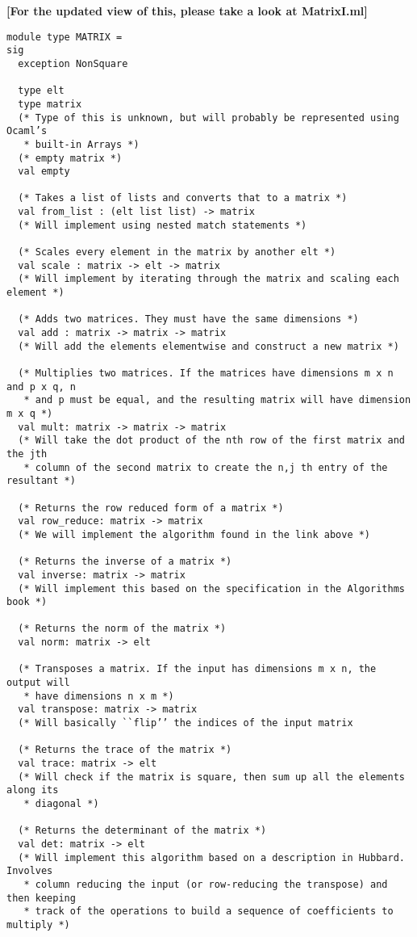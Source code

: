 \documentclass[letterpaper,11pt]{article}
\newcommand{\annot}[1]{\textbf{\color{BrickRed} [#1]}}
\begin{document}
{\annot{For the updated view of this, please take a look at MatrixI.ml}}
\begin{verbatim}
module type MATRIX = 
sig
  exception NonSquare
  
  type elt
  type matrix
  (* Type of this is unknown, but will probably be represented using Ocaml’s
   * built-in Arrays *)
  (* empty matrix *)
  val empty

  (* Takes a list of lists and converts that to a matrix *)
  val from_list : (elt list list) -> matrix
  (* Will implement using nested match statements *)

  (* Scales every element in the matrix by another elt *)
  val scale : matrix -> elt -> matrix
  (* Will implement by iterating through the matrix and scaling each element *)

  (* Adds two matrices. They must have the same dimensions *)
  val add : matrix -> matrix -> matrix
  (* Will add the elements elementwise and construct a new matrix *)

  (* Multiplies two matrices. If the matrices have dimensions m x n and p x q, n
   * and p must be equal, and the resulting matrix will have dimension m x q *)
  val mult: matrix -> matrix -> matrix
  (* Will take the dot product of the nth row of the first matrix and the jth
   * column of the second matrix to create the n,j th entry of the resultant *)

  (* Returns the row reduced form of a matrix *)
  val row_reduce: matrix -> matrix 
  (* We will implement the algorithm found in the link above *)

  (* Returns the inverse of a matrix *)
  val inverse: matrix -> matrix
  (* Will implement this based on the specification in the Algorithms book *)

  (* Returns the norm of the matrix *)
  val norm: matrix -> elt

  (* Transposes a matrix. If the input has dimensions m x n, the output will
   * have dimensions n x m *)
  val transpose: matrix -> matrix
  (* Will basically ``flip’’ the indices of the input matrix

  (* Returns the trace of the matrix *)
  val trace: matrix -> elt
  (* Will check if the matrix is square, then sum up all the elements along its
   * diagonal *)

  (* Returns the determinant of the matrix *)
  val det: matrix -> elt
  (* Will implement this algorithm based on a description in Hubbard. Involves
   * column reducing the input (or row-reducing the transpose) and then keeping 
   * track of the operations to build a sequence of coefficients to multiply *)


\end{verbatim}
\end{document}
